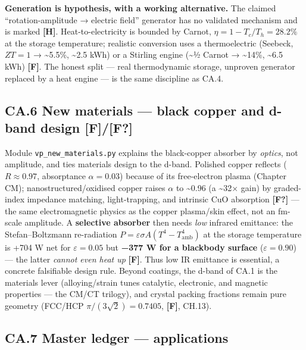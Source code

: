 \documentclass[
  10pt,
]{article}
\begin{document}
\textbf{Generation is hypothesis, with a working alternative.} The
claimed ``rotation-amplitude → electric field'' generator has no
validated mechanism and is marked \textbf{{[}H{]}}. Heat-to-electricity
is bounded by Carnot, \(\eta=1-T_c/T_h=28.2\%\) at the storage
temperature; realistic conversion uses a thermoelectric (Seebeck,
\(ZT=1\) → \textasciitilde5.5\%, \textasciitilde2.5 kWh) or a Stirling
engine (\textasciitilde½ Carnot → \textasciitilde14\%,
\textasciitilde6.5 kWh) \textbf{{[}F{]}}. The honest split --- real
thermodynamic storage, unproven generator replaced by a heat engine ---
is the same discipline as CA.4.

\hypertarget{ca.6-new-materials-black-copper-and-d-band-design-ff}{%
\subsection{\texorpdfstring{CA.6 New materials --- black copper and
d-band design
\textbf{{[}F{]}/{[}F?{]}}}{CA.6 New materials --- black copper and d-band design {[}F{]}/{[}F?{]}}}\label{ca.6-new-materials-black-copper-and-d-band-design-ff}}

Module \texttt{vp\_new\_materials.py} explains the black-copper absorber
by \emph{optics}, not amplitude, and ties materials design to the
d-band. Polished copper reflects (\(R\approx0.97\), absorptance
\(\alpha=0.03\)) because of its free-electron plasma (Chapter CM);
nanostructured/oxidised copper raises \(\alpha\) to \textasciitilde0.96
(a \textasciitilde32× gain) by graded-index impedance matching,
light-trapping, and intrinsic CuO absorption \textbf{{[}F?{]}} --- the
same electromagnetic physics as the copper plasma/skin effect, not an
fm-scale amplitude. A \textbf{selective absorber} then needs \emph{low}
infrared emittance: the Stefan--Boltzmann re-radiation
\(P=\varepsilon\sigma A(T^4-T_{\text{amb}}^4)\) at the storage
temperature is +704 W net for \(\varepsilon=0.05\) but \textbf{−377 W
for a blackbody surface} (\(\varepsilon=0.90\)) --- the latter
\emph{cannot even heat up} \textbf{{[}F{]}}. Thus low IR emittance is
essential, a concrete falsifiable design rule. Beyond coatings, the
d-band of CA.1 is the materials lever (alloying/strain tunes catalytic,
electronic, and magnetic properties --- the CM/CT trilogy), and crystal
packing fractions remain pure geometry (FCC/HCP
\(\pi/(3\sqrt2)=0.7405\), \textbf{{[}F{]}}, CH.13).

\hypertarget{ca.7-master-ledger-applications}{%
\subsection{CA.7 Master ledger ---
applications}\label{ca.7-master-ledger-applications}}
\end{document}
